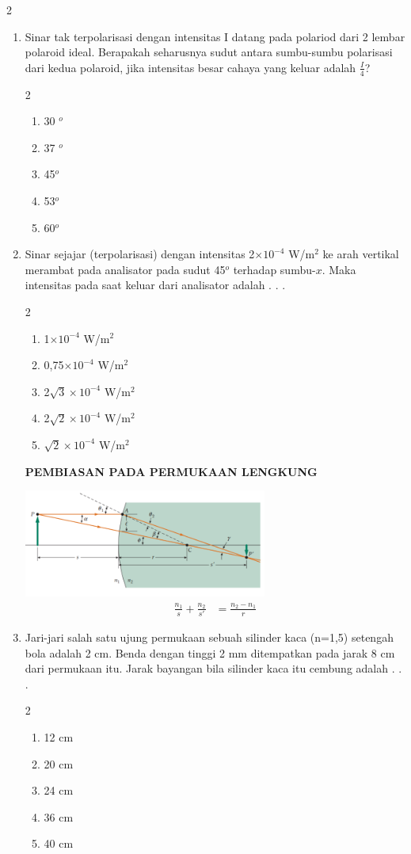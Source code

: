 \documentclass[10pt,a4paper]{extarticle}
\newcommand{\pilgani}[1]{                            \vspace{-0.3cm}\begin{multicols}{2}
 \begin{enumerate}[label=\Alph*., itemsep=0pt,topsep=0pt,leftmargin=*,align=Center]#1                     \end{enumerate}
 \phantom{ini cuma sapi, wedus, dan ayam}
 \end{multicols}}
\begin{document}
\begin{multicols*}{2}
\begin{enumerate}
\item Sinar tak terpolarisasi dengan intensitas I datang pada polariod dari 2 lembar polaroid ideal. Berapakah seharusnya sudut antara sumbu-sumbu polarisasi dari kedua polaroid, jika intensitas besar cahaya yang keluar adalah $\frac{I}{4}$?
\pilgani{
        \item 30 $^o$
        \item 37 $^o$
        \item 45$^o$
        \item 53$^o$
        \item 60$^o$
        }
\vspace{2cm}
\item Sinar sejajar (terpolarisasi) dengan intensitas 2$\times 10^{-4}$ W/m$^2$ ke arah vertikal merambat pada analisator pada sudut 45$^o$ terhadap sumbu-$x$. Maka intensitas pada saat keluar dari analisator adalah . . . 
\pilgani{
        \item 1$\times 10^{-4}$ W/m$^2$
        \item 0,75$\times 10^{-4}$ W/m$^2$
        \item 2$\sqrt{3}\times 10^{-4}$ W/m$^2$
        \item 2$\sqrt{2}\times 10^{-4}$ W/m$^2$
        \item $\sqrt{2}\times 10^{-4}$ W/m$^2$
        }
\vspace{4cm}
        
\textbf{PEMBIASAN PADA PERMUKAAN LENGKUNG}
\graphicspath{ {pic/} }
\includegraphics[width=8cm]{rumuslensasingle}
\begin{align*}
\frac{n_1}{s}+\frac{n_2}{s'}&=\frac{n_2-n_1}{r}
\end{align*}

\item Jari-jari salah satu ujung permukaan sebuah silinder kaca (n=1,5) setengah bola adalah 2 cm. Benda dengan tinggi 2 mm ditempatkan pada jarak 8 cm dari permukaan itu. Jarak bayangan bila silinder kaca itu cembung adalah . . .
\pilgani{
        \item 12 cm
        \item 20 cm
        \item 24 cm
        \item 36 cm
        \item 40 cm
        }


\end{enumerate}
\end{multicols*}
\end{document}
